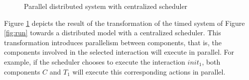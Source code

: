 \begin{figure}[H]
\begin{adjustwidth}{-8mm}{-12mm}
\end{adjustwidth}
\caption{\small Parallel distributed system with centralized scheduler}\label{fig:mul}
\end{figure}
\begin{example}
  Figure \ref{fig:mul} depicts the result of the transformation of the timed system of
  Figure \ref{fig:run} towards a distributed model with a centralized scheduler. 
  This transformation introduces parallelism between components, that is,
  the components involved in the selected interaction will execute in parallel.
  For example, if the scheduler chooses to execute the interaction
  $init_1$, both components $C$ and $T_1$ will execute this corresponding actions in parallel.
\end{example}

